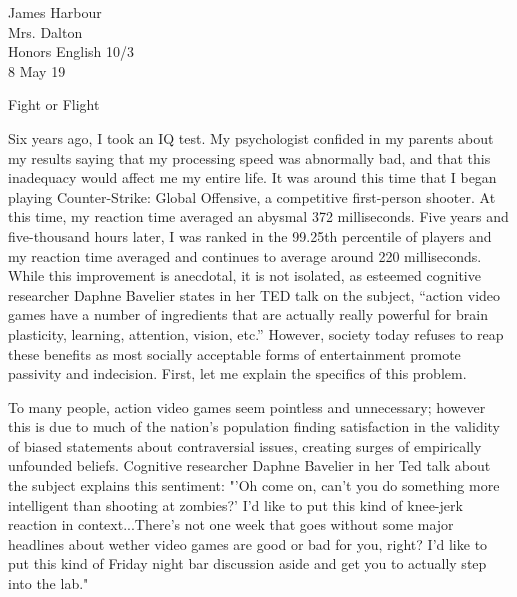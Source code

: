 \documentclass[12pt]{article}
\begin{document}
\begin{flushleft}

James Harbour \\
Mrs. Dalton \\
Honors English 10/3 \\
8 May 19 \\

\begin{center}
Fight or Flight
\end{center}

\setlength{\parindent}{0.5in}

\normalsize

Six years ago, I took an IQ test. My psychologist confided in my parents about my results saying that my processing speed was abnormally bad, and that this inadequacy would affect me my entire life. It was around this time that I began playing Counter-Strike: Global Offensive, a competitive first-person shooter. At this time, my reaction time averaged an abysmal 372 milliseconds. Five years and five-thousand hours later, I was ranked in the 99.25th percentile of players and my reaction time averaged and continues to average around 220 milliseconds. While this improvement is anecdotal, it is not isolated, as esteemed cognitive researcher Daphne Bavelier states in her TED talk on the subject, “action video games have a number of ingredients that are actually really powerful for brain plasticity, learning, attention, vision, etc.” However, society today refuses to reap these benefits as most socially acceptable forms of entertainment promote passivity and indecision. First, let me explain the specifics of this problem.

To many people, action video games seem pointless and unnecessary; however this is due to much of the nation's population finding satisfaction in the validity of biased statements about contraversial issues, creating surges of empirically unfounded beliefs. Cognitive researcher Daphne Bavelier in her Ted talk about the subject explains this sentiment: "'Oh come on, can't you do something more intelligent than shooting at zombies?' I'd like to put this kind of knee-jerk reaction in context...There's not one week that goes without some major headlines about wether video games are good or bad for you, right? I'd like to put this kind of Friday night bar discussion aside and get you to actually step into the lab."


\end{flushleft}
\end{document}
